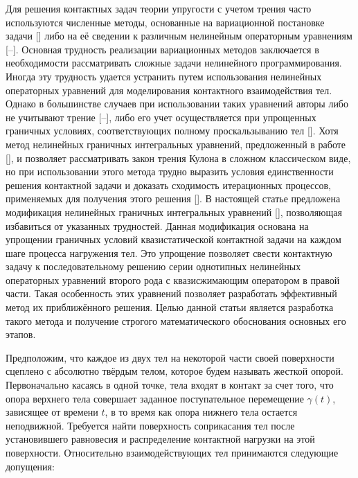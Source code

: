 \date{24/I/2016} %



\makerutitle




Для решения контактных задач теории упругости с учетом трения часто используются численные методы, основанные на вариационной постановке задачи [] либо на её сведении к различным нелинейным операторным уравнениям [--].
Основная трудность реализации вариационных методов заключается в необходимости рассматривать сложные задачи нелинейного программирования.
Иногда эту трудность удается устранить путем использования нелинейных операторных уравнений для моделирования контактного взаимодействия тел.
Однако в большинстве случаев при использовании таких уравнений авторы либо не учитывают трение [--], либо его учет осуществляется при упрощенных граничных условиях, соответствующих полному проскальзыванию тел [].
Хотя метод нелинейных граничных интегральных уравнений, предложенный в работе [], и позволяет рассматривать закон трения Кулона в сложном классическом виде, но при использовании этого метода трудно выразить условия единственности решения контактной задачи и доказать сходимость итерационных процессов, применяемых для получения этого решения [].
В настоящей статье  предложена  модификация нелинейных граничных интегральных уравнений [],  позволяющая избавиться от указанных трудностей.
Данная модификация основана на упрощении граничных условий квазистатической контактной задачи на каждом шаге процесса нагружения тел.
Это упрощение позволяет свести контактную задачу к последовательному решению серии однотипных нелинейных операторных уравнений второго рода с квазисжимающим оператором в правой части.
Такая особенность этих уравнений позволяет разработать эффективный метод их приближённого решения.
Целью данной статьи является разработка такого метода и получение строгого математического обоснования основных его этапов.

\smallskip

Предположим, что каждое из двух  тел на некоторой части своей поверхности сцеплено с абсолютно твёрдым телом, которое будем называть жесткой опорой.
Первоначально касаясь в одной точке, тела входят в контакт за счет того, что опора верхнего тела совершает  заданное поступательное перемещение  $\gamma \left(t\right)$, зависящее от времени $t$, в то время как опора нижнего тела остается неподвижной.
Требуется найти поверхность соприкасания тел после установившего равновесия и распределение контактной нагрузки на этой поверхности.
Относительно взаимодействующих тел принимаются следующие допущения:

